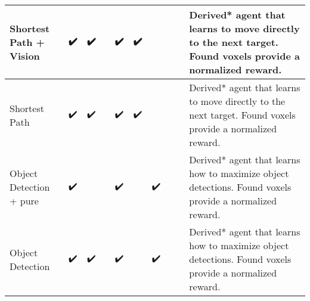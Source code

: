 {\begin{landscape}
\begin{table}[]
{\begin{tabular}{l|cccccccc|l}
            \multicolumn{1}{|l|}{Shortest Path + Vision} & \multicolumn{1}{c|}{✔️} & \multicolumn{1}{c|}{✔️} & \multicolumn{1}{c|}{} & \multicolumn{1}{c|}{✔️} & \multicolumn{1}{c|}{✔️} & \multicolumn{1}{c|}{} & \multicolumn{1}{c|}{} &  & \multicolumn{1}{l|}{Derived* agent that learns to move directly to the next target. Found voxels provide a normalized reward.} \\ \hline
            \multicolumn{1}{|l|}{Shortest Path} & \multicolumn{1}{c|}{✔️} & \multicolumn{1}{c|}{✔️} & \multicolumn{1}{c|}{} & \multicolumn{1}{c|}{✔️} & \multicolumn{1}{c|}{✔️} & \multicolumn{1}{c|}{} & \multicolumn{1}{c|}{} &  & \multicolumn{1}{l|}{Derived* agent that learns to move directly to the next target. Found voxels provide a normalized reward.} \\ \hline
            \multicolumn{1}{|l|}{Object Detection + pure} & \multicolumn{1}{c|}{✔️} & \multicolumn{1}{c|}{} & \multicolumn{1}{c|}{} & \multicolumn{1}{c|}{✔️} & \multicolumn{1}{c|}{} & \multicolumn{1}{c|}{✔️} & \multicolumn{1}{c|}{} &  & \multicolumn{1}{l|}{Derived* agent that learns how to maximize object detections. Found voxels provide a normalized reward.} \\ \hline
            \multicolumn{1}{|l|}{Object Detection} & \multicolumn{1}{c|}{✔️} & \multicolumn{1}{c|}{✔️} & \multicolumn{1}{c|}{} & \multicolumn{1}{c|}{✔️} & \multicolumn{1}{c|}{} & \multicolumn{1}{c|}{✔️} & \multicolumn{1}{c|}{} &  & \multicolumn{1}{l|}{Derived* agent that learns how to maximize object detections. Found voxels provide a normalized reward.} \\ \hline

\end{tabular}}
\end{table}
\end{landscape}}
